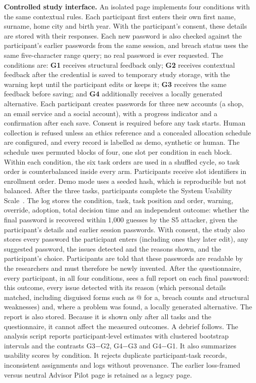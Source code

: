 \documentclass[preprint,12pt]{elsarticle}
\begin{document}
\textbf{Controlled study interface.} An isolated page implements four conditions with the same contextual rules. Each participant first enters their own first name, surname, home city and birth year. With the participant's consent, these details are stored with their responses. Each new password is also checked against the participant's earlier passwords from the same session, and breach status uses the same five-character range query; no real password is ever requested. The conditions are: \textbf{G1} receives structural feedback only; \textbf{G2} receives contextual feedback after the credential is saved to temporary study storage, with the warning kept until the participant edits or keeps it; \textbf{G3} receives the same feedback before saving; and \textbf{G4} additionally receives a locally generated alternative. Each participant creates passwords for three new accounts (a shop, an email service and a social account), with a progress indicator and a confirmation after each save. Consent is required before any task starts. Human collection is refused unless an ethics reference and a concealed allocation schedule are configured, and every record is labelled as demo, synthetic or human. The schedule uses permuted blocks of four, one slot per condition in each block. Within each condition, the six task orders are used in a shuffled cycle, so task order is counterbalanced inside every arm. Participants receive slot identifiers in enrollment order. Demo mode uses a seeded hash, which is reproducible but not balanced. After the three tasks, participants complete the System Usability Scale~\cite{brooke}. The log stores the condition, task, task position and order, warning, override, adoption, total decision time and an independent outcome: whether the final password is recovered within 1,000 guesses by the S5 attacker, given the participant's details and earlier session passwords. With consent, the study also stores every password the participant enters (including ones they later edit), any suggested password, the issues detected and the reasons shown, and the participant's choice. Participants are told that these passwords are readable by the researchers and must therefore be newly invented. After the questionnaire, every participant, in all four conditions, sees a full report on each final password: this outcome, every issue detected with its reason (which personal details matched, including disguised forms such as @ for a, breach counts and structural weaknesses) and, where a problem was found, a locally generated alternative. The report is also stored. Because it is shown only after all tasks and the questionnaire, it cannot affect the measured outcomes. A debrief follows. The analysis script reports participant-level estimates with clustered bootstrap intervals and the contrasts G3$-$G2, G4$-$G3 and G4$-$G1. It also summarizes usability scores by condition. It rejects duplicate participant-task records, inconsistent assignments and logs without provenance. The earlier loss-framed versus neutral Advisor Pilot page is retained as a legacy page.
\end{document}
